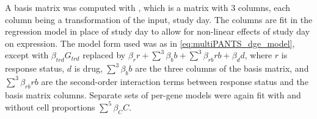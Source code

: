 A basis matrix \autocite{perperoglou2019ReviewSplineFunction} was computed with ,
which is a matrix with 3 columns, each column being a transformation of the input, study day.
The columns are fit in the regression model in place of study day to allow for non-linear effects of study day on expression.
The model form used was as in \cref{eq:multiPANTS_dge_model},
except with $\beta_{trd} G_{trd}$
replaced by $\beta_r r + \sum_{}^{3}{\beta_b b} + \sum_{}^{3}{\beta_{rb} rb} + \beta_d d$,
where $r$ is response status,
$d$ is drug,
$\sum_{}^{3}{\beta_b b}$ are the three columns of the basis matrix,
and $\sum_{}^{3}{\beta_{rb} rb}$ are the second-order interaction terms between response status and the basis matrix columns.
Separate sets of per-gene models were again fit with and without cell proportions $\sum_{}^{5}{\beta_C C}$.

%

